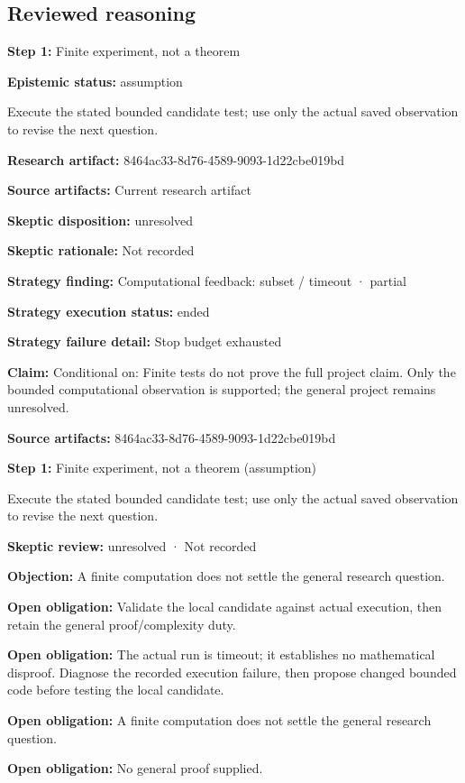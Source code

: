 \documentclass[11pt]{article}
\begin{document}
\subsection{Reviewed reasoning}
\textbf{Step 1:} Finite experiment, not a theorem\par
\textbf{Epistemic status:} assumption\par
Execute the stated bounded candidate test; use only the actual saved observation to revise the next question.\par
\textbf{Research artifact:} 8464ac33-8d76-4589-9093-1d22cbe019bd\par
\textbf{Source artifacts:} Current research artifact\par
\textbf{Skeptic disposition:} unresolved\par
\textbf{Skeptic rationale:} Not recorded\par
\textbf{Strategy finding:} Computational feedback: subset / timeout · partial\par
\textbf{Strategy execution status:} ended\par
\textbf{Strategy failure detail:} Stop budget exhausted\par
\textbf{Claim:} Conditional on: Finite tests do not prove the full project claim. Only the bounded computational observation is supported; the general project remains unresolved.\par
\textbf{Source artifacts:} 8464ac33-8d76-4589-9093-1d22cbe019bd\par
\textbf{Step 1:} Finite experiment, not a theorem (assumption)\par
Execute the stated bounded candidate test; use only the actual saved observation to revise the next question.\par
\textbf{Skeptic review:} unresolved · Not recorded\par
\textbf{Objection:} A finite computation does not settle the general research question.\par
\textbf{Open obligation:} Validate the local candidate against actual execution, then retain the general proof/complexity duty.\par
\textbf{Open obligation:} The actual run is timeout; it establishes no mathematical disproof. Diagnose the recorded execution failure, then propose changed bounded code before testing the local candidate.\par
\textbf{Open obligation:} A finite computation does not settle the general research question.\par
\textbf{Open obligation:} No general proof supplied.\par
\end{document}
